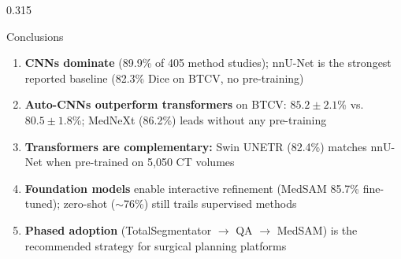 \documentclass[final,t]{beamer}
\begin{document}
\begin{frame}[t]
\begin{columns}[t,totalwidth=\textwidth]
\begin{column}{0.315\textwidth}
\begin{pblock}{Conclusions}
\begin{enumerate}\setlength\itemsep{2pt}
  \item \textbf{CNNs dominate} (89.9\% of 405 method studies); nnU-Net is
        the strongest reported baseline (82.3\% Dice on BTCV, no pre-training)
  \item \textbf{Auto-CNNs outperform transformers} on BTCV:
        $85.2 \pm 2.1$\% vs.\ $80.5 \pm 1.8$\%;
        MedNeXt (86.2\%) leads without any pre-training
  \item \textbf{Transformers are complementary:} Swin UNETR (82.4\%) matches
        nnU-Net when pre-trained on 5,050 CT volumes
  \item \textbf{Foundation models} enable interactive refinement
        (MedSAM 85.7\% fine-tuned); zero-shot ($\sim$76\%) still trails
        supervised methods
  \item \textbf{Phased adoption} (TotalSegmentator $\to$ QA $\to$ MedSAM)
        is the recommended strategy for surgical planning platforms
\end{enumerate}
\end{pblock}


\end{column}
\end{columns}
\end{frame}
\end{document}
